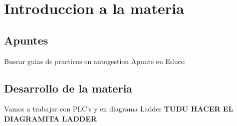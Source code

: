 \chapter*{Introduccion a la materia}
\section*{Apuntes}
Buscar guias de practicos en autogestion
Apunte en Educo

\section*{Desarrollo de la materia}
Vamos a trabajar con PLC's y en diagrama Ladder
\textbf{TUDU HACER EL DIAGRAMITA LADDER}
